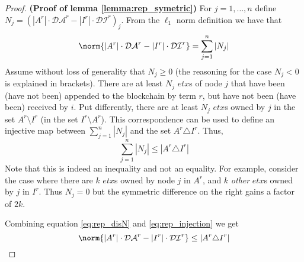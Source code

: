 \begin{proof}\textbf{(Proof of lemma \ref{lemma:rep_symetric})}
For $j=1,\dots,n$ define $N_j=\left(|A^r|\cdot \mathcal{DA}^r-|I^r|\cdot \mathcal{DI}^{r}\right)_j$. From the $\ell _1$ norm definition we have that
\begin{equation} \label{eq:rep_disN}
\norm{|A^r|\cdot \mathcal{DA}^r-|I^r|\cdot \mathcal{DI}^{r}} =\sum _{j=1}^n \left |N_j \right |
\end{equation} 
Assume without loss of generality that $N_j\geq 0$ (the reasoning for the case $N_j<0$ is explained in brackets). There are at least $N_j$ $etx$s of node $j$ that have been (have not been) appended to the blockchain by term $r$, but have not been (have been) received by $i$. Put differently, there are at least $N_j$ $etx$s owned by $j$ in the set $A^r \setminus I^{r}$ (in the set $I^{r}\setminus A^r$). This correspondence can be used to define an injective map between $\sum _{j=1}^n \left |N_j \right |$ and the set $A^r \triangle I^{r}$. Thus,
\begin{equation}\label{eq:rep_injection}
\sum _{j=1}^n \left |N_j \right |\leq |A^r \triangle I^{r}| 
\end{equation}
Note that this is indeed an inequality and not an equality. For example, consider the case where there are $k$ $etx$s owned by node $j$ in $A^r$, and $k$ \emph{other} $etx$s owned by $j$ in $I^r$. Thus $N_j=0$ but the symmetric difference on the right gains a factor of $2k$.

Combining equation \ref{eq:rep_disN} and \ref{eq:rep_injection} we get
\begin{equation}
\norm{|A^r|\cdot \mathcal{DA}^r-|I^r|\cdot \mathcal{DI}^{r}}\leq  |A^r \triangle I^{r}| 
\end{equation}
\end{proof}

